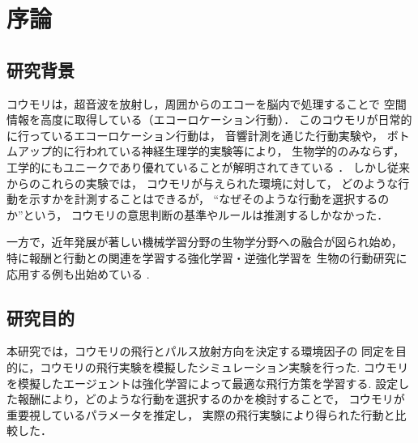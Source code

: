 \documentclass[../main]{subfiles}
\begin{document}
\newpage
\chapter{序論}

\section{研究背景}
コウモリは，超音波を放射し，周囲からのエコーを脳内で処理することで
空間情報を高度に取得している（エコーロケーション行動）．
このコウモリが日常的に行っているエコーロケーション行動は，
音響計測を通じた行動実験や，
ボトムアップ的に行われている神経生理学的実験等により，
生物学的のみならず，
工学的にもユニークであり優れていることが解明されてきている
\cite{ref:bat_enhance}\cite{ref:echolocating_bats}．
しかし従来からのこれらの実験では，
コウモリが与えられた環境に対して，
どのような行動を示すかを計測することはできるが，
“なぜそのような行動を選択するのか”という，
コウモリの意思判断の基準やルールは推測するしかなかった．

一方で，近年発展が著しい機械学習分野の生物学分野への融合が図られ始め，
特に報酬と行動との関連を学習する強化学習・逆強化学習を
生物の行動研究に応用する例も出始めている
\cite{ref:simulating_bout}\cite{ref:can_ai}.


\section{研究目的}
本研究では，コウモリの飛行とパルス放射方向を決定する環境因子の
同定を目的に，コウモリの飛行実験を模擬したシミュレーション実験を行った.
コウモリを模擬したエージェントは強化学習によって最適な飛行方策を学習する.
設定した報酬により，どのような行動を選択するのかを検討することで，
コウモリが重要視しているパラメータを推定し，
実際の飛行実験により得られた行動と比較した．
\end{document}
